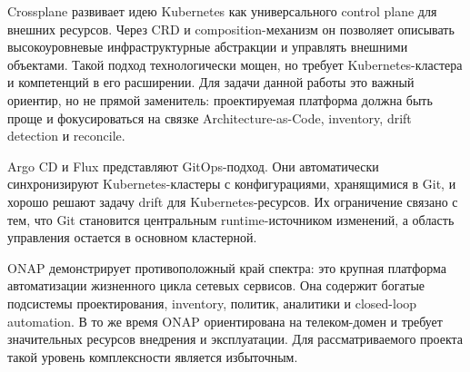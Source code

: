 Crossplane развивает идею Kubernetes как универсального control plane для внешних ресурсов. Через CRD и composition-механизм он позволяет описывать высокоуровневые инфраструктурные абстракции и управлять внешними объектами. Такой подход технологически мощен, но требует Kubernetes-кластера и компетенций в его расширении. Для задачи данной работы это важный ориентир, но не прямой заменитель: проектируемая платформа должна быть проще и фокусироваться на связке Architecture-as-Code, inventory, drift detection и reconcile.

Argo CD и Flux представляют GitOps-подход. Они автоматически синхронизируют Kubernetes-кластеры с конфигурациями, хранящимися в Git, и хорошо решают задачу drift для Kubernetes-ресурсов. Их ограничение связано с тем, что Git становится центральным runtime-источником изменений, а область управления остается в основном кластерной.

ONAP демонстрирует противоположный край спектра: это крупная платформа автоматизации жизненного цикла сетевых сервисов. Она содержит богатые подсистемы проектирования, inventory, политик, аналитики и closed-loop automation. В то же время ONAP ориентирована на телеком-домен и требует значительных ресурсов внедрения и эксплуатации. Для рассматриваемого проекта такой уровень комплексности является избыточным.


